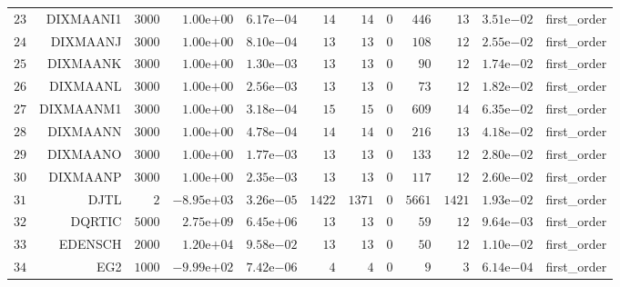 \begin{longtable}{rrrrrrrrrrrr}
  \(    23\) & DIXMAANI1 & \(  3000\) & \( 1.00\)e\(+00\) & \( 6.17\)e\(-04\) & \(    14\) & \(    14\) & \(     0\) & \(   446\) & \(    13\) & \( 3.51\)e\(-02\) & first\_order \\
  \(    24\) & DIXMAANJ & \(  3000\) & \( 1.00\)e\(+00\) & \( 8.10\)e\(-04\) & \(    13\) & \(    13\) & \(     0\) & \(   108\) & \(    12\) & \( 2.55\)e\(-02\) & first\_order \\
  \(    25\) & DIXMAANK & \(  3000\) & \( 1.00\)e\(+00\) & \( 1.30\)e\(-03\) & \(    13\) & \(    13\) & \(     0\) & \(    90\) & \(    12\) & \( 1.74\)e\(-02\) & first\_order \\
  \(    26\) & DIXMAANL & \(  3000\) & \( 1.00\)e\(+00\) & \( 2.56\)e\(-03\) & \(    13\) & \(    13\) & \(     0\) & \(    73\) & \(    12\) & \( 1.82\)e\(-02\) & first\_order \\
  \(    27\) & DIXMAANM1 & \(  3000\) & \( 1.00\)e\(+00\) & \( 3.18\)e\(-04\) & \(    15\) & \(    15\) & \(     0\) & \(   609\) & \(    14\) & \( 6.35\)e\(-02\) & first\_order \\
  \(    28\) & DIXMAANN & \(  3000\) & \( 1.00\)e\(+00\) & \( 4.78\)e\(-04\) & \(    14\) & \(    14\) & \(     0\) & \(   216\) & \(    13\) & \( 4.18\)e\(-02\) & first\_order \\
  \(    29\) & DIXMAANO & \(  3000\) & \( 1.00\)e\(+00\) & \( 1.77\)e\(-03\) & \(    13\) & \(    13\) & \(     0\) & \(   133\) & \(    12\) & \( 2.80\)e\(-02\) & first\_order \\
  \(    30\) & DIXMAANP & \(  3000\) & \( 1.00\)e\(+00\) & \( 2.35\)e\(-03\) & \(    13\) & \(    13\) & \(     0\) & \(   117\) & \(    12\) & \( 2.60\)e\(-02\) & first\_order \\
  \(    31\) & DJTL & \(     2\) & \(-8.95\)e\(+03\) & \( 3.26\)e\(-05\) & \(  1422\) & \(  1371\) & \(     0\) & \(  5661\) & \(  1421\) & \( 1.93\)e\(-02\) & first\_order \\
  \(    32\) & DQRTIC & \(  5000\) & \( 2.75\)e\(+09\) & \( 6.45\)e\(+06\) & \(    13\) & \(    13\) & \(     0\) & \(    59\) & \(    12\) & \( 9.64\)e\(-03\) & first\_order \\
  \(    33\) & EDENSCH & \(  2000\) & \( 1.20\)e\(+04\) & \( 9.58\)e\(-02\) & \(    13\) & \(    13\) & \(     0\) & \(    50\) & \(    12\) & \( 1.10\)e\(-02\) & first\_order \\
  \(    34\) & EG2 & \(  1000\) & \(-9.99\)e\(+02\) & \( 7.42\)e\(-06\) & \(     4\) & \(     4\) & \(     0\) & \(     9\) & \(     3\) & \( 6.14\)e\(-04\) & first\_order \\

\end{longtable}
